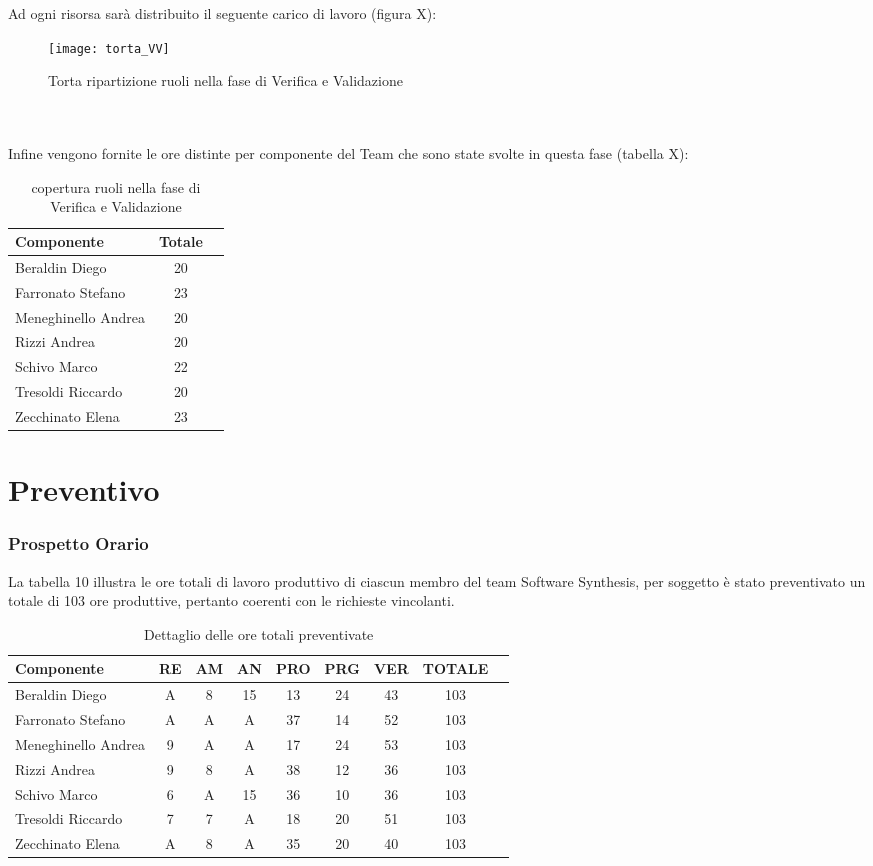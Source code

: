 \\\\
Ad ogni risorsa sarà distribuito il seguente carico di lavoro (figura X):\\
\begin{figure}[h]
  \texttt{[image: torta\_VV]}
\caption{Torta ripartizione ruoli nella fase di Verifica e Validazione}
\end{figure}
\\\\
Infine vengono fornite le ore distinte per componente del Team che sono state svolte in questa fase (tabella X):\\
\begin{table}[h]
\centering
\begin{tabular}{|l|cl|}
\hline
Componente& Totale& \\
\hline
Beraldin Diego & 20&\\
Farronato Stefano & 23&\\
Meneghinello Andrea & 20&\\
Rizzi Andrea & 20&\\
Schivo Marco & 22&\\
Tresoldi Riccardo & 20&\\
Zecchinato Elena & 23&\\
\hline
\end{tabular}
\caption{copertura ruoli nella fase di Verifica e Validazione}
\end{table}

\section{Preventivo}
\subsubsection{Prospetto Orario}
La tabella 10 illustra le ore totali di lavoro produttivo di ciascun membro del team Software Synthesis, per soggetto è stato preventivato un totale di 103 ore produttive, pertanto coerenti con le richieste vincolanti.
\begin{table}[h]
\centering
\begin{tabular}{|l|c|c|c|c|c|c|cl|}
\hline
Componente& RE& AM& AN& PRO& PRG& VER& TOTALE&\\
\hline
Beraldin Diego & A& 8& 15& 13& 24& 43& 103&\\
Farronato Stefano & A& A& A& 37& 14& 52&  103&\\
Meneghinello Andrea & 9& A& A& 17& 24& 53& 103&\\
Rizzi Andrea & 9& 8& A& 38& 12& 36& 103&\\
Schivo Marco & 6& A& 15& 36& 10& 36& 103&\\
Tresoldi Riccardo & 7& 7& A& 18& 20& 51& 103&\\
Zecchinato Elena & A& 8& A& 35& 20& 40& 103&\\
\hline
\end{tabular}
\caption{Dettaglio delle ore totali preventivate}
\end{table}

